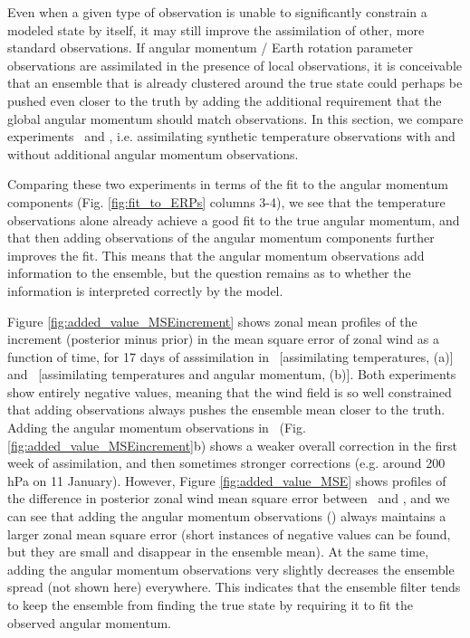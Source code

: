 Even when a given type of observation is unable to significantly constrain a modeled state by itself, it may still improve the assimilation of other, more standard observations.  
If angular momentum / Earth rotation parameter observations are assimilated in the presence of local observations, it is conceivable that an ensemble that is already clustered around the true state could perhaps be pushed even closer to the truth by adding the additional requirement that the global angular momentum should match observations. 
In this section, we compare experiments \RST~and \ERPRST, i.e. assimilating synthetic temperature observations with and without additional angular momentum observations.

Comparing these two experiments in terms of the fit to the angular momentum components (Fig. \ref{fig:fit_to_ERPs} columns 3-4), we see that the temperature observations alone already achieve a good fit to the true angular momentum, and that 
then adding observations of the angular momentum components further improves the fit.  
This means that the angular momentum observations add information to the ensemble, but the question remains as to whether the information is interpreted correctly by the model.

Figure \ref{fig:added_value_MSEincrement} shows zonal mean profiles of the increment (posterior minus prior) in the mean square error of zonal wind as a function of time, for 17 days of asssimilation in \RST~[assimilating temperatures, (a)] and \ERPRST~[assimilating temperatures and angular momentum, (b)].  
Both experiments show entirely negative values, meaning that the wind field is so well constrained that adding observations always pushes the ensemble mean closer to the truth. 
Adding the angular momentum observations in \ERPRST~(Fig. \ref{fig:added_value_MSEincrement}b) shows a weaker overall correction in the first week of assimilation, and then sometimes stronger corrections (e.g. around 200 hPa on 11 January). 
However, 
Figure \ref{fig:added_value_MSE} shows profiles of the difference in posterior zonal wind mean square error between \ERPRST~and \RST, and we can see that 
adding the angular momentum observations (\ERPRST) always maintains a larger zonal mean square error (short instances of negative values can be found, but they are small and disappear in the ensemble mean). 
At the same time, adding the angular momentum observations very slightly decreases the ensemble spread (not shown here) everywhere.  
This indicates that the ensemble filter tends to keep the ensemble from finding the true state by requiring it to fit the observed angular momentum.  

